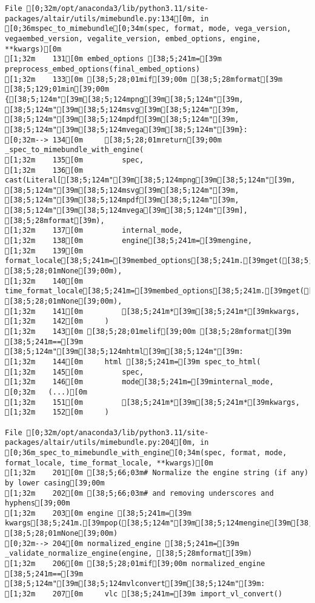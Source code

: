 \documentclass[
  letterpaper,
  DIV=11,
  numbers=noendperiod]{scrartcl}
\begin{document}
\begin{verbatim}
File [0;32m/opt/anaconda3/lib/python3.11/site-packages/altair/utils/mimebundle.py:134[0m, in [0;36mspec_to_mimebundle[0;34m(spec, format, mode, vega_version, vegaembed_version, vegalite_version, embed_options, engine, **kwargs)[0m
[1;32m    131[0m embed_options [38;5;241m=[39m preprocess_embed_options(final_embed_options)
[1;32m    133[0m [38;5;28;01mif[39;00m [38;5;28mformat[39m [38;5;129;01min[39;00m {[38;5;124m"[39m[38;5;124mpng[39m[38;5;124m"[39m, [38;5;124m"[39m[38;5;124msvg[39m[38;5;124m"[39m, [38;5;124m"[39m[38;5;124mpdf[39m[38;5;124m"[39m, [38;5;124m"[39m[38;5;124mvega[39m[38;5;124m"[39m}:
[0;32m--> 134[0m     [38;5;28;01mreturn[39;00m _spec_to_mimebundle_with_engine(
[1;32m    135[0m         spec,
[1;32m    136[0m         cast(Literal[[38;5;124m"[39m[38;5;124mpng[39m[38;5;124m"[39m, [38;5;124m"[39m[38;5;124msvg[39m[38;5;124m"[39m, [38;5;124m"[39m[38;5;124mpdf[39m[38;5;124m"[39m, [38;5;124m"[39m[38;5;124mvega[39m[38;5;124m"[39m], [38;5;28mformat[39m),
[1;32m    137[0m         internal_mode,
[1;32m    138[0m         engine[38;5;241m=[39mengine,
[1;32m    139[0m         format_locale[38;5;241m=[39membed_options[38;5;241m.[39mget([38;5;124m"[39m[38;5;124mformatLocale[39m[38;5;124m"[39m, [38;5;28;01mNone[39;00m),
[1;32m    140[0m         time_format_locale[38;5;241m=[39membed_options[38;5;241m.[39mget([38;5;124m"[39m[38;5;124mtimeFormatLocale[39m[38;5;124m"[39m, [38;5;28;01mNone[39;00m),
[1;32m    141[0m         [38;5;241m*[39m[38;5;241m*[39mkwargs,
[1;32m    142[0m     )
[1;32m    143[0m [38;5;28;01melif[39;00m [38;5;28mformat[39m [38;5;241m==[39m [38;5;124m"[39m[38;5;124mhtml[39m[38;5;124m"[39m:
[1;32m    144[0m     html [38;5;241m=[39m spec_to_html(
[1;32m    145[0m         spec,
[1;32m    146[0m         mode[38;5;241m=[39minternal_mode,
[0;32m   (...)[0m
[1;32m    151[0m         [38;5;241m*[39m[38;5;241m*[39mkwargs,
[1;32m    152[0m     )

File [0;32m/opt/anaconda3/lib/python3.11/site-packages/altair/utils/mimebundle.py:204[0m, in [0;36m_spec_to_mimebundle_with_engine[0;34m(spec, format, mode, format_locale, time_format_locale, **kwargs)[0m
[1;32m    201[0m [38;5;66;03m# Normalize the engine string (if any) by lower casing[39;00m
[1;32m    202[0m [38;5;66;03m# and removing underscores and hyphens[39;00m
[1;32m    203[0m engine [38;5;241m=[39m kwargs[38;5;241m.[39mpop([38;5;124m"[39m[38;5;124mengine[39m[38;5;124m"[39m, [38;5;28;01mNone[39;00m)
[0;32m--> 204[0m normalized_engine [38;5;241m=[39m _validate_normalize_engine(engine, [38;5;28mformat[39m)
[1;32m    206[0m [38;5;28;01mif[39;00m normalized_engine [38;5;241m==[39m [38;5;124m"[39m[38;5;124mvlconvert[39m[38;5;124m"[39m:
[1;32m    207[0m     vlc [38;5;241m=[39m import_vl_convert()


\end{verbatim}
\end{document}
